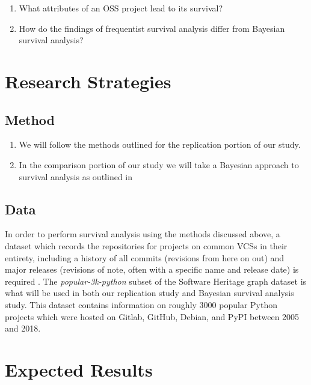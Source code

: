 \documentclass[conference]{IEEEtran}
\begin{document}
\begin{enumerate}
    \item What attributes of an OSS project lead to its survival?
    \item How do the findings of frequentist survival analysis differ from Bayesian survival analysis?
\end{enumerate}


\section{Research Strategies}

\subsection{Method}

\begin{enumerate}
    \item We will follow the methods outlined \cite{ali2020cheating} for the replication portion of our study.
    \item In the comparison portion of our study we will take a Bayesian approach to survival analysis as outlined in \cite{kelter2020bayesian}
\end{enumerate}

\subsection{Data}

In order to perform survival analysis using the methods discussed above, a dataset which records the repositories for projects on common VCSs in their entirety, including a history of all commits (revisions from here on out) and major releases (revisions of note, often with a specific name and release date) is required \cite{ali2020cheating}. The \emph{popular-3k-python} subset of the Software Heritage graph dataset \cite{pietri2019software} is what will be used in both our replication study and Bayesian survival analysis study. This dataset contains information on roughly 3000 popular Python projects which were hosted on Gitlab, GitHub, Debian, and PyPI between 2005 and 2018.

\section{Expected Results}
\end{document}
